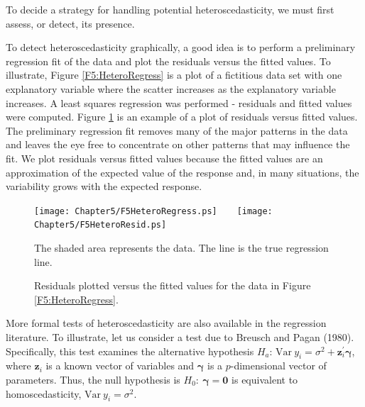 To decide a strategy for handling potential heteroscedasticity, we
must first assess, or detect, its presence.

To detect heteroscedasticity graphically, a good idea is to perform
a preliminary regression fit of the data and plot the residuals
versus the fitted values. To illustrate, Figure
\ref{F5:HeteroRegress} is a plot of a fictitious data set with one
explanatory variable where the scatter increases as the explanatory
variable increases. A least squares regression was performed -
residuals and fitted values were computed. Figure
\ref{F5:HeteroResid} is an example of a plot of residuals versus
fitted values. The preliminary regression fit removes many of the
major patterns in the data and leaves the eye free to concentrate on
other patterns that may influence the fit. We plot residuals versus
fitted values because the fitted values are an approximation of the
expected value of the response and, in many situations, the
variability grows with the expected response.


\begin{figure}[htp]
    \texttt{[image: Chapter5/F5HeteroRegress.ps]}
    $~~~~~~$
    \texttt{[image: Chapter5/F5HeteroResid.ps]}    \hfill
      \parbox[t]{2.5in}{\caption{\label{F5:HeteroRegress} \small  The shaded area
represents the data. The line is the true regression line.}} \hfill
        \parbox[t]{2.5in}{ \caption{\label{F5:HeteroResid} \small  Residuals plotted
versus the fitted values for the data in Figure
\ref{F5:HeteroRegress}.}}
\end{figure}

More formal tests of heteroscedasticity are also available in the
regression literature. To illustrate, let us consider a test due to
Breusch and Pagan (1980). Specifically, this test examines the
alternative hypothesis $H_a$: $\mathrm{Var~} y_i = \sigma^2 +
\mathbf{z}_i^{\prime} \boldsymbol \gamma $, where $\mathbf{z}_i$ is
a known vector of variables and $\boldsymbol \gamma$ is a
$p$-dimensional vector of parameters. Thus, the null hypothesis is
$H_0:~ \boldsymbol \gamma = \mathbf{0}$ is equivalent to
homoscedasticity,  $\mathrm{Var~} y_i = \sigma^2.$

\bigskip

\boxedjed

